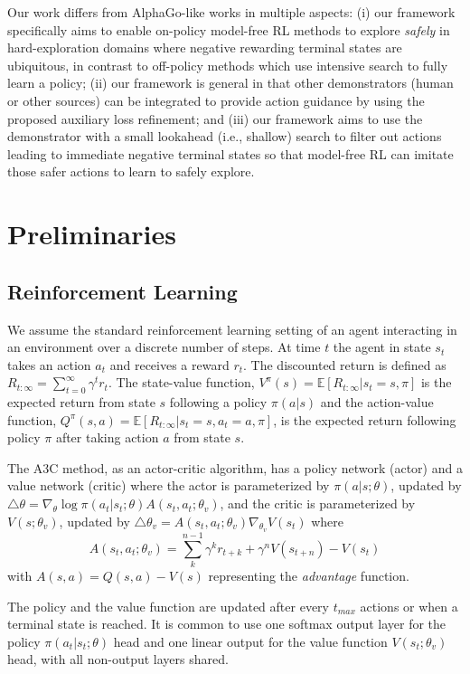 \documentclass[letterpaper]{article} %
\begin{document}
Our work differs from AlphaGo-like works in multiple aspects: (i) our framework specifically aims to enable on-policy model-free RL methods to explore \emph{safely} in hard-exploration domains where negative rewarding terminal states are ubiquitous, in contrast to off-policy methods which use intensive search to fully learn a policy; (ii) our framework is general in that other demonstrators (human or other sources) can be integrated to provide action guidance by using the proposed auxiliary loss refinement; and
(iii) our framework aims to use the demonstrator with a small lookahead (i.e., shallow) search to filter out actions leading to immediate negative terminal states so that model-free RL can imitate those safer actions to learn to safely explore.


\section{Preliminaries}

\subsection{Reinforcement Learning}

We assume the standard reinforcement learning setting of an agent interacting in an environment over a discrete number of steps. At time $t$ the agent in state $s_t$ takes an action $a_t$ and receives a reward $r_t$. The discounted return is defined as $R_{t:\infty} = \sum_{t=0}^\infty \gamma^t r_t$. The state-value function, $V^\pi(s)=\mathbb{E}[R_{t:\infty}|s_t=s,\pi]$ is the expected return from state $s$ following a policy $\pi(a|s)$
and the action-value function, $Q^\pi(s,a)=\mathbb{E}[R_{t:\infty}|s_t=s, a_t=a,\pi]$, is the expected return following policy $\pi$ after taking action $a$ from state $s$.

The A3C method, as an actor-critic algorithm, has a policy network (actor) and a value network (critic) where the actor is parameterized by $\pi(a|s;\theta)$, updated by ${\triangle\theta = \nabla_\theta \log \pi(a_t|s_t; \theta) A(s_t, a_t; \theta_v)}$, and the critic is parameterized by $V(s; \theta_v)$, updated by ${\triangle\theta_v = A(s_t, a_t; \theta_v) \nabla_{\theta_v} V(s_t)}$ where $$A(s_t, a_t; \theta_v) = \sum_k^{n-1} \gamma^kr_{t+k} + \gamma^n V(s_{t+n}) - V (s_t)$$
with $A(s,a)=Q(s,a)-V(s)$ representing the \emph{advantage} function.

The policy and the value function are updated after every $t_{max}$ actions or when a terminal state is reached. It is common to use one softmax output layer for the policy $\pi(a_t|s_t; \theta)$ head and one linear output for the value function $V (s_t; \theta_v)$ head, with all non-output layers shared.
\end{document}
